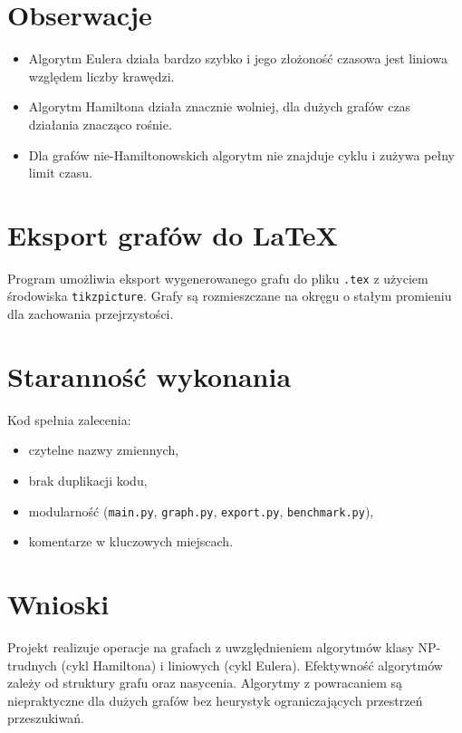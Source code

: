 \documentclass[a4paper,12pt]{article}
\begin{document}
\section{Obserwacje}
\begin{itemize}
    \item Algorytm Eulera działa bardzo szybko i jego złożoność czasowa jest liniowa względem liczby krawędzi.
    \item Algorytm Hamiltona działa znacznie wolniej, dla dużych grafów czas działania znacząco rośnie.
    \item Dla grafów nie-Hamiltonowskich algorytm nie znajduje cyklu i zużywa pełny limit czasu.
\end{itemize}

\section{Eksport grafów do LaTeX}
Program umożliwia eksport wygenerowanego grafu do pliku \texttt{.tex} z użyciem środowiska \texttt{tikzpicture}. Grafy są rozmieszczane na okręgu o stałym promieniu dla zachowania przejrzystości.

\section{Staranność wykonania}
Kod spełnia zalecenia:
\begin{itemize}
    \item czytelne nazwy zmiennych,
    \item brak duplikacji kodu,
    \item modularność (\texttt{main.py}, \texttt{graph.py}, \texttt{export.py}, \texttt{benchmark.py}),
    \item komentarze w kluczowych miejscach.
\end{itemize}

\section{Wnioski}
Projekt realizuje operacje na grafach z uwzględnieniem algorytmów klasy NP-trudnych (cykl Hamiltona) i liniowych (cykl Eulera). Efektywność algorytmów zależy od struktury grafu oraz nasycenia. Algorytmy z powracaniem są niepraktyczne dla dużych grafów bez heurystyk ograniczających przestrzeń przeszukiwań.
\end{document}

